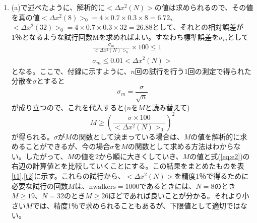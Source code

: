 \documentclass{jsarticle}
\begin{document}
\begin{enumerate}
                \begin{enumerate}
                    \item (a)で述べたように、解析的に$< \Delta x^{2}(N)> $の値は求められるので、その値を真の値$< \Delta x^{2}(8)> _{0} = 4 \times 0.7 \times 0.3 \times 8 = 6.72$、$< \Delta x^{2}(32)> _{0} = 4 \times 0.7 \times 0.3 \times 32 = 26.88$として、それとの相対誤差が1％となるような試行回数Mを求めればよい。すなわち標準誤差を$\sigma_{m}$として
                    \begin{eqnarray}
                        \frac{\sigma_{m}}{< \Delta x^{2}(N)> _{0}} \times 100 \leq 1 \\
                        \sigma_{m} \leq 0.01 <\Delta x^{2}(N)> 
                    \end{eqnarray}
                    となる。ここで、付録に示すように、$n$回の試行を行う1回の測定で得られた分散を$\sigma$とすると
                    \begin{equation}
                        \sigma_{m} = \frac{\sigma}{\sqrt{n}}
                    \end{equation}
                    が成り立つので、これを代入すると($n$を$M$と読み替えて)
                    \begin{equation}
                        M \geq \left( \frac{\sigma\times 100}{< \Delta x^{2}(N)>_{0}}\right) ^{2}
                        \label{eq:e2}
                    \end{equation}
                    が得られる。$\sigma$が$M$の関数として決まっている場合は、$M$の値を解析的に求めることができるが、今の場合$\sigma$を$M$の関数として求める方法はわからない。したがって、$M$の値を2から順に大きくしていき、$M$の値と式(\ref{eq:e2})の右辺の計算値とを比較していくことにする。この結果をまとめたものを表\ref{t1},\ref{t2}に示す。これらの試行から、$< \Delta x^{2}(N)> $を精度1％で得るために必要な試行の回数$M$は、$\mathrm{nwalkers}=1000$であるときには、$N=8$のとき$M\geq 19$、$N=32$のとき$M\geq 26$ほどであれば良いことが分かる。それより小さい$M$では、精度1％で求められることもあるが、下限値として適切ではない。
                    \begin{table}[H]
                        \begin{center}
                            \begin{tabular}{cc}


\end{tabular}
\end{center}
\end{table}
\end{enumerate}
\end{enumerate}
\end{document}
